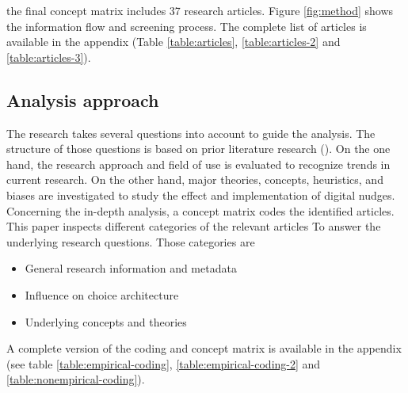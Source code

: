 the final concept matrix includes 37 research articles. Figure \ref{fig:method} shows the information flow and screening process. The complete list of articles is available in the appendix (Table \ref{table:articles}, \ref{table:articles-2} and \ref{table:articles-3}).

\subsection{Analysis approach}
The research takes several questions into account to guide the analysis. The structure of those questions is based on prior literature research (\cite{alavi_review_1992}). On the one hand, the research approach and field of use is evaluated to recognize trends in current research. On the other hand, major theories, concepts, heuristics, and biases are investigated to study the effect and implementation of digital nudges.
Concerning the in-depth analysis, a concept matrix codes the identified articles. This paper inspects different categories of the relevant articles To answer the underlying research questions. Those categories are 
\begin{itemize}
\item General research information and metadata
\item Influence on choice architecture
\item Underlying concepts and theories
\end{itemize}

A complete version of the coding and concept matrix is available in the appendix (see table \ref{table:empirical-coding}, \ref{table:empirical-coding-2} and \ref{table:nonempirical-coding}).